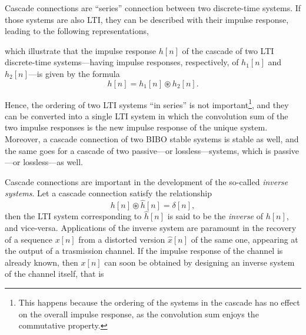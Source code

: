 \documentclass[\documentfontsize, twocolumn]{\classname}
\begin{document}
Cascade connections are ``series'' connection between two discrete-time systems. If those systems are also LTI, they can be described with their impulse response, leading to the following representations,
\begin{center}
\end{center}
which illustrate that the impulse response $h[n]$ of the cascade of two LTI discrete-time systems---having impulse responses, respectively, of $h_1[n]$ and $h_2[n]$---is given by the formula
\begin{equation}\label{eqn:cascadeConnectionFormula}
    h[n]=h_1[n] \circledast h_2[n].
\end{equation}

Hence, the ordering of two LTI systems ``in series'' is not important\footnote{This happens because the ordering of the systems in the cascade has no effect on the overall impulse response, as the convolution sum enjoys the commutative property.}, and they can be converted into a single LTI system in which the convolution sum of the two impulse responses is the new impulse response of the unique system. Moreover, a cascade connection of two BIBO stable systems is stable as well, and the same goes for a cascade of two passive---or lossless---systems, which is passive---or lossless---as well.

Cascade connections are important in the development of the so-called \emph{inverse systems}. Let a cascade connection satisfy the relationship \[h[n] \circledast \hat h[n] = \delta[n],\] then the LTI system corresponding to $\hat h[n]$ is said to be the \emph{inverse} of $h[n]$, and vice-versa. Applications of the inverse system are paramount in the recovery of a sequence $x[n]$ from a distorted version $\hat x[n]$ of the same one, appearing at the output of a trasmission channel. If the impulse response of the channel is already known, then $x[n]$ can soon be obtained by designing an inverse system of the channel itself, that is
\end{document}
